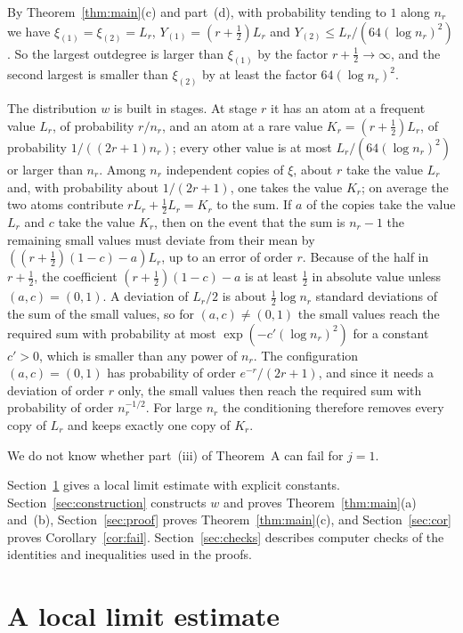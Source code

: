 \documentclass[11pt]{amsart}
\numberwithin{equation}{section}
\begin{document}
By Theorem~\ref{thm:main}(c) and part~(d), with probability tending to $1$ along $n_r$ we have $\xi_{(1)}=\xi_{(2)}=L_r$, $Y_{(1)}=(r+\frac12)L_r$ and $Y_{(2)}\le L_r/(64(\log n_r)^2)$. So the largest outdegree is larger than $\xi_{(1)}$ by the factor $r+\frac12\to\infty$, and the second largest is smaller than $\xi_{(2)}$ by at least the factor $64(\log n_r)^2$.

The distribution $w$ is built in stages. At stage $r$ it has an atom at a frequent value $L_r$, of probability $r/n_r$, and an atom at a rare value $K_r=(r+\frac12)L_r$, of probability $1/((2r+1)n_r)$; every other value is at most $L_r/(64(\log n_r)^2)$ or larger than $n_r$. Among $n_r$ independent copies of $\xi$, about $r$ take the value $L_r$ and, with probability about $1/(2r+1)$, one takes the value $K_r$; on average the two atoms contribute $rL_r+\frac12L_r=K_r$ to the sum. If $a$ of the copies take the value $L_r$ and $c$ take the value $K_r$, then on the event that the sum is $n_r-1$ the remaining small values must deviate from their mean by $((r+\frac12)(1-c)-a)L_r$, up to an error of order $r$. Because of the half in $r+\frac12$, the coefficient $(r+\frac12)(1-c)-a$ is at least $\frac12$ in absolute value unless $(a,c)=(0,1)$. A deviation of $L_r/2$ is about $\frac12\log n_r$ standard deviations of the sum of the small values, so for $(a,c)\ne(0,1)$ the small values reach the required sum with probability at most $\exp(-c'(\log n_r)^2)$ for a constant $c'>0$, which is smaller than any power of $n_r$. The configuration $(a,c)=(0,1)$ has probability of order $e^{-r}/(2r+1)$, and since it needs a deviation of order $r$ only, the small values then reach the required sum with probability of order $n_r^{-1/2}$. For large $n_r$ the conditioning therefore removes every copy of $L_r$ and keeps exactly one copy of $K_r$.

We do not know whether part~(iii) of Theorem~A can fail for $j=1$.

Section~\ref{sec:llt} gives a local limit estimate with explicit constants. Section~\ref{sec:construction} constructs $w$ and proves Theorem~\ref{thm:main}(a) and~(b), Section~\ref{sec:proof} proves Theorem~\ref{thm:main}(c), and Section~\ref{sec:cor} proves Corollary~\ref{cor:fail}. Section~\ref{sec:checks} describes computer checks of the identities and inequalities used in the proofs.

\section{A local limit estimate}\label{sec:llt}
\end{document}
